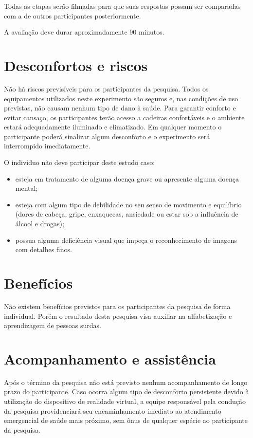 \documentclass[a4paper,11pt,titlepage,singlespacing]{article}
\begin{document}
Todas as etapas serão filmadas para que suas respostas possam ser comparadas com a de outros participantes posteriormente.

A avaliação deve durar aproximadamente 90 minutos.


\section*{Desconfortos e riscos}

\noindent Não há riscos previsíveis para os participantes da pesquisa. Todos os equipamentos utilizados neste experimento são seguros e, nas condições de uso previstas, não causam nenhum tipo de dano à saúde. Para garantir conforto e evitar cansaço, os participantes terão acesso a cadeiras confortáveis e o ambiente estará adequadamente iluminado e climatizado. Em qualquer momento o participante poderá sinalizar algum desconforto e o experimento será interrompido imediatamente.

O indivíduo não deve participar deste estudo caso:

\begin{itemize}
\item esteja em tratamento de alguma doença grave ou apresente alguma doença mental;
\item esteja com algum tipo de debilidade no seu senso de movimento e equilíbrio (dores de cabeça, gripe, enxaquecas, ansiedade ou estar sob a influência de álcool e drogas);
\item possua alguma deficiência visual que impeça o reconhecimento de imagens com detalhes finos.
\end{itemize}

\section*{Benefícios}


Não existem benefícios previstos para os participantes da pesquisa de forma individual. Porém o resultado desta pesquisa visa auxiliar na alfabetização e aprendizagem de pessoas surdas.

\section*{Acompanhamento e assistência}

Após o término da pesquisa não está previsto nenhum acompanhamento de longo prazo do participante. Caso ocorra algum tipo de desconforto persistente devido à utilização do dispositivo de realidade virtual, a equipe responsável pela condução da pesquisa providenciará seu encaminhamento imediato ao atendimento emergencial de saúde mais próximo, sem ônus de qualquer espécie ao participante da pesquisa.
\end{document}
